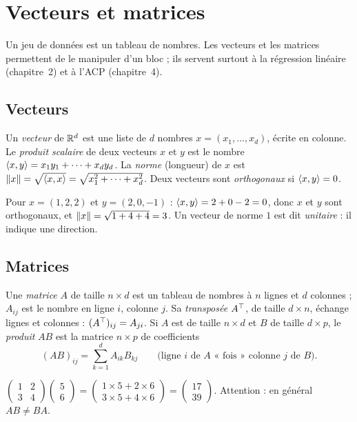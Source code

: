 \section{Vecteurs et matrices}
\label{sec:algebre}

Un jeu de données est un tableau de nombres. Les vecteurs et les matrices permettent de le manipuler d'un bloc ; ils servent surtout à la régression linéaire (chapitre~2) et à l'ACP (chapitre~4).

\subsection{Vecteurs}

\begin{definition}
Un \emph{vecteur} de $\mathbb{R}^d$ est une liste de $d$ nombres $x=(x_1,\dots,x_d)$, écrite en colonne.
Le \emph{produit scalaire} de deux vecteurs $x$ et $y$ est le nombre $\left\langle x,y\right\rangle=x_1y_1+\dots+x_dy_d$.
La \emph{norme} (longueur) de $x$ est $\left\lVert x\right\rVert=\sqrt{\left\langle x,x\right\rangle}=\sqrt{x_1^2+\dots+x_d^2}$.
Deux vecteurs sont \emph{orthogonaux} si $\left\langle x,y\right\rangle=0$.
\end{definition}

\begin{exemple}
Pour $x=(1,2,2)$ et $y=(2,0,-1)$ : $\left\langle x,y\right\rangle=2+0-2=0$, donc $x$ et $y$ sont orthogonaux, et $\left\lVert x\right\rVert=\sqrt{1+4+4}=3$.
Un vecteur de norme $1$ est dit \emph{unitaire} : il indique une direction.
\end{exemple}

\subsection{Matrices}

\begin{definition}
Une \emph{matrice} $A$ de taille $n\times d$ est un tableau de nombres à $n$ lignes et $d$ colonnes ; $A_{ij}$ est le nombre en ligne $i$, colonne $j$.
Sa \emph{transposée} $A^{\top}$, de taille $d\times n$, échange lignes et colonnes : $(A^{\top})_{ij}=A_{ji}$.
Si $A$ est de taille $n\times d$ et $B$ de taille $d\times p$, le \emph{produit} $AB$ est la matrice $n\times p$ de coefficients
\[
  (AB)_{ij}=\sum_{k=1}^dA_{ik}B_{kj}\qquad\text{(ligne $i$ de $A$ « fois » colonne $j$ de $B$).}
\]
\end{definition}

\begin{exemple}
$\begin{pmatrix}1&2\\3&4\end{pmatrix}\begin{pmatrix}5\\6\end{pmatrix}=\begin{pmatrix}1\times5+2\times6\\3\times5+4\times6\end{pmatrix}=\begin{pmatrix}17\\39\end{pmatrix}$.
Attention : en général $AB\ne BA$.
\end{exemple}

